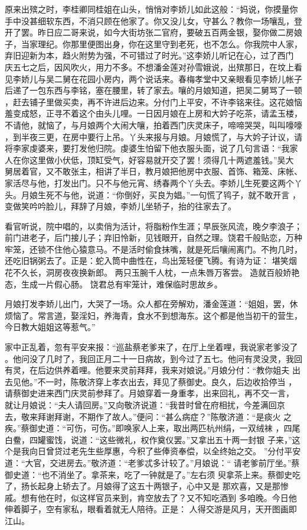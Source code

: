 原来出殡之时，李桂卿同桂姐在山头，悄悄对李娇儿如此这般：“妈说，你摸量你
手中没甚细软东西，不消只顾在他家了。你又没儿女，守甚么？教你一场嚷乱，登
开了罢。昨日应二哥来说，如今大街坊张二官府，要破五百两金银，娶你做二房娘
子，当家理纪。你那里便图出身，你在这里守到老死，也不怎么。你我院中人家，
弃旧迎新为本，趋火附势为强，不可错过了时光。”这李娇儿听记在心，过了西门
庆五七之后，因风吹火，用力不多。不想潘金莲对孙雪娥说，出殡那日，在坟上看
见李娇儿与吴二舅在花园小房内，两个说话来。春梅孝堂中又亲眼看见李娇儿帐子
后递了一包东西与李铭，塞在腰里，转了家去。嚷的月娘知道，把吴二舅骂了一顿
，赶去铺子里做买卖，再不许进后边来。分付门上平安，不许李铭来往。这花娘恼
羞变成怒，正寻不着这个由头儿哩。一日因月娘在上房和大妗子吃茶，请孟玉楼，
不请他，就恼了，与月娘两个大闹大嚷，拍着西门庆灵床子，啼啼哭哭，叫叫嚎嚎
，到半夜三更，在房中要行上吊。丫头来报与月娘。月娘慌了，与大妗子计议，请
将李家虔婆来，要打发他归院。虔婆生怕留下他衣服头面，说了几句言语：“我家
人在你这里做小伏低，顶缸受气，好容易就开交了罢！须得几十两遮羞钱。”吴大
舅居着官，又不敢张主，相讲了半日，教月娘把他房中衣服、首饰、箱笼、床帐、
家活尽与他，打发出门。只不与他元宵、绣春两个丫头去。李娇儿生死要这两个丫
头。月娘生死不与他，说道：“你倒好，买良为娼。”一句慌了鸨子，就不敢开言
，变做笑吟吟脸儿，拜辞了月娘，李娇儿坐轿子，抬的往家去了。

看官听说，院中唱的，以卖俏为活计，将脂粉作生涯；早辰张风流，晚夕李浪子；
前门进老子，后门接儿子；弃旧怜新，见钱眼开，自然之理。饶君千般贴恋，万种
牢笼，还锁不住他心猿意马。不是活时偷食抹嘴，就是死后嚷闹离门。不拘几时，
还吃旧锅粥去了。正是：蛇入筒中曲性在，鸟出笼轻便飞腾。有诗为证：
堪笑烟花不久长，洞房夜夜换新郎。
两只玉腕千人枕，一点朱唇万客尝。
造就百般娇艳态，生成一片假心肠。
饶君总有牢笼计，难保临时思故乡。

月娘打发李娇儿出门，大哭了一场。众人都在旁解劝，潘金莲道：“姐姐，罢，休
烦恼了。常言道，娶淫妇，养海青，食水不到想海东。这个都是他当初干的营生，
今日教大姐姐这等惹气。”

家中正乱着，忽有平安来报：“巡盐蔡老爹来了，在厅上坐着哩，我说家老爹没了
。他问没了几时了，我回正月二十一日病故，到今过了五七。他问有灵没灵，我回
有灵，在后边供养着哩。他要来灵前拜拜，我来对娘说。”月娘分付：“教你姐夫
出去见他。”不一时，陈敬济穿上孝衣出去，拜见了蔡御史。良久，后边收拾停当
，请蔡御史进来西门庆灵前参拜了。月娘穿着一身重孝，出来回礼，再不交一言，
就让月娘说：“夫人请回房。”又向敬济说道：“我昔时曾在府相扰，今差满回京
去，敬来拜谢拜谢，不期作了故人。”便问：“甚么病症？”陈敬济道：“是痰火
之疾。”蔡御史道：“可伤，可伤。”即唤家人上来，取出两匹杭州绢，一双绒袜
，四尾白鲞，四罐蜜饯，说道：“这些微礼，权作奠仪罢。”又拿出五十两一封银
子来，”这个是我向日曾贷过老先生些厚惠，今积了些俸资奉偿，以全终始之交。
”分付平安道：“大官，交进房去。”敬济道：“老爹忒多计较了。”月娘说：“
请老爹前厅坐。”蔡御史道：“也不消坐了。拿茶来，吃了一钟就是了。”左右须
臾拿茶上来。蔡御史吃了，扬长起身上轿去了。月娘得了这五十两银子，心中又是
那欢喜，又是那惨戚。想有他在时，似这样官员来到，肯空放去了？又不知吃酒到
多咱晚。今日他伸着脚子，空有家私，眼看着就无人陪待。正是：
人得交游是风月，天开图画即江山。

